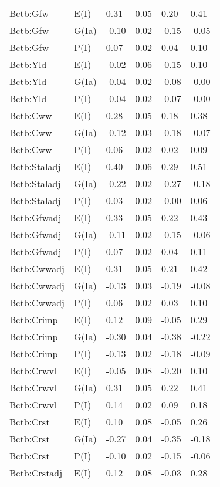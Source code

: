 \begin{center}
\begin{longtable}{|p{1.1in}|p{0.7in}|p{0.7in}|p{0.6in}|p{0.6in}|p{0.6in}|}
  Bctb:Gfw & E(I) & 0.31 & 0.05 & 0.20 & 0.41 \\ 
  Bctb:Gfw & G(Ia) & -0.10 & 0.02 & -0.15 & -0.05 \\ 
  Bctb:Gfw & P(I) & 0.07 & 0.02 & 0.04 & 0.10 \\ 
  Bctb:Yld & E(I) & -0.02 & 0.06 & -0.15 & 0.10 \\ 
  Bctb:Yld & G(Ia) & -0.04 & 0.02 & -0.08 & -0.00 \\ 
  Bctb:Yld & P(I) & -0.04 & 0.02 & -0.07 & -0.00 \\ 
  Bctb:Cww & E(I) & 0.28 & 0.05 & 0.18 & 0.38 \\ 
  Bctb:Cww & G(Ia) & -0.12 & 0.03 & -0.18 & -0.07 \\ 
  Bctb:Cww & P(I) & 0.06 & 0.02 & 0.02 & 0.09 \\ 
  Bctb:Staladj & E(I) & 0.40 & 0.06 & 0.29 & 0.51 \\ 
  Bctb:Staladj & G(Ia) & -0.22 & 0.02 & -0.27 & -0.18 \\ 
  Bctb:Staladj & P(I) & 0.03 & 0.02 & -0.00 & 0.06 \\ 
  Bctb:Gfwadj & E(I) & 0.33 & 0.05 & 0.22 & 0.43 \\ 
  Bctb:Gfwadj & G(Ia) & -0.11 & 0.02 & -0.15 & -0.06 \\ 
  Bctb:Gfwadj & P(I) & 0.07 & 0.02 & 0.04 & 0.11 \\ 
  Bctb:Cwwadj & E(I) & 0.31 & 0.05 & 0.21 & 0.42 \\ 
  Bctb:Cwwadj & G(Ia) & -0.13 & 0.03 & -0.19 & -0.08 \\ 
  Bctb:Cwwadj & P(I) & 0.06 & 0.02 & 0.03 & 0.10 \\ 
  Bctb:Crimp & E(I) & 0.12 & 0.09 & -0.05 & 0.29 \\ 
  Bctb:Crimp & G(Ia) & -0.30 & 0.04 & -0.38 & -0.22 \\ 
  Bctb:Crimp & P(I) & -0.13 & 0.02 & -0.18 & -0.09 \\ 
  Bctb:Crwvl & E(I) & -0.05 & 0.08 & -0.20 & 0.10 \\ 
  Bctb:Crwvl & G(Ia) & 0.31 & 0.05 & 0.22 & 0.41 \\ 
  Bctb:Crwvl & P(I) & 0.14 & 0.02 & 0.09 & 0.18 \\ 
  Bctb:Crst & E(I) & 0.10 & 0.08 & -0.05 & 0.26 \\ 
  Bctb:Crst & G(Ia) & -0.27 & 0.04 & -0.35 & -0.18 \\ 
  Bctb:Crst & P(I) & -0.10 & 0.02 & -0.15 & -0.06 \\ 
  Bctb:Crstadj & E(I) & 0.12 & 0.08 & -0.03 & 0.28 \\ 

\end{longtable}
\end{center}
